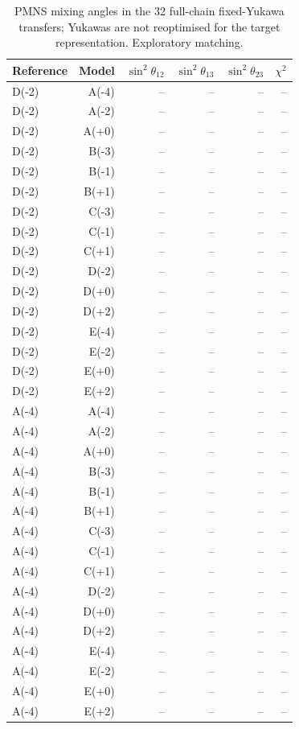 \begin{table}[htbp]
\centering
\small
\setlength{\tabcolsep}{3.4pt}
\begin{tabular}{lrrrrr}
\hline
Reference & Model & $\sin^2\theta_{12}$ & $\sin^2\theta_{13}$ & $\sin^2\theta_{23}$ & $\chi^2$ \\
\hline
D(-2) & A(-4) & -- & -- & -- & -- \\
D(-2) & A(-2) & -- & -- & -- & -- \\
D(-2) & A(+0) & -- & -- & -- & -- \\
D(-2) & B(-3) & -- & -- & -- & -- \\
D(-2) & B(-1) & -- & -- & -- & -- \\
D(-2) & B(+1) & -- & -- & -- & -- \\
D(-2) & C(-3) & -- & -- & -- & -- \\
D(-2) & C(-1) & -- & -- & -- & -- \\
D(-2) & C(+1) & -- & -- & -- & -- \\
D(-2) & D(-2) & -- & -- & -- & -- \\
D(-2) & D(+0) & -- & -- & -- & -- \\
D(-2) & D(+2) & -- & -- & -- & -- \\
D(-2) & E(-4) & -- & -- & -- & -- \\
D(-2) & E(-2) & -- & -- & -- & -- \\
D(-2) & E(+0) & -- & -- & -- & -- \\
D(-2) & E(+2) & -- & -- & -- & -- \\
A(-4) & A(-4) & -- & -- & -- & -- \\
A(-4) & A(-2) & -- & -- & -- & -- \\
A(-4) & A(+0) & -- & -- & -- & -- \\
A(-4) & B(-3) & -- & -- & -- & -- \\
A(-4) & B(-1) & -- & -- & -- & -- \\
A(-4) & B(+1) & -- & -- & -- & -- \\
A(-4) & C(-3) & -- & -- & -- & -- \\
A(-4) & C(-1) & -- & -- & -- & -- \\
A(-4) & C(+1) & -- & -- & -- & -- \\
A(-4) & D(-2) & -- & -- & -- & -- \\
A(-4) & D(+0) & -- & -- & -- & -- \\
A(-4) & D(+2) & -- & -- & -- & -- \\
A(-4) & E(-4) & -- & -- & -- & -- \\
A(-4) & E(-2) & -- & -- & -- & -- \\
A(-4) & E(+0) & -- & -- & -- & -- \\
A(-4) & E(+2) & -- & -- & -- & -- \\
\hline
\end{tabular}
\caption{PMNS mixing angles in the 32 full-chain fixed-Yukawa transfers; Yukawas are not reoptimised for the target representation. Exploratory matching.}
\label{tab:generalised_b3}
\end{table}
